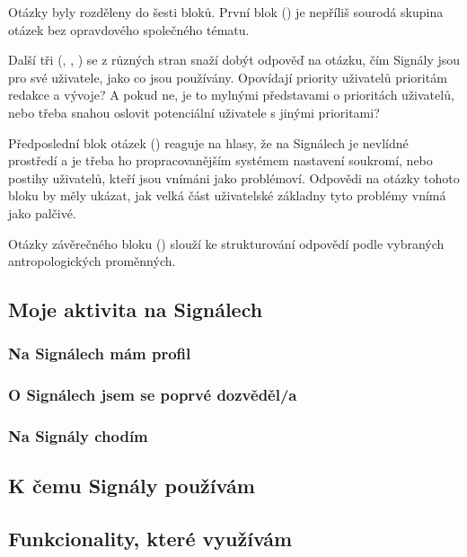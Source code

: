 \documentclass[12pt, a4paper, twoside]{article}
\begin{document}
Otázky byly rozděleny do šesti bloků.
První blok ()
je nepříliš sourodá skupina otázek bez opravdového společného tématu.

Další tři
(, , )
se z různých stran snaží dobýt odpověď na otázku, čím Signály jsou
pro své uživatele, jako co jsou používány.
Opovídají priority uživatelů prioritám redakce a vývoje?
A pokud ne, je to mylnými představami o prioritách uživatelů,
nebo třeba snahou oslovit potenciální uživatele s jinými prioritami?

Předposlední blok otázek ()
reaguje na hlasy, že na Signálech je nevlídné prostředí
a je třeba ho  propracovanějším systémem nastavení
soukromí, nebo postihy uživatelů, kteří jsou vnímáni jako problémoví.
Odpovědi na otázky tohoto bloku by měly ukázat, jak velká část
uživatelské základny tyto problémy vnímá jako palčivé.

Otázky závěrečného bloku ()
slouží ke strukturování odpovědí
podle vybraných antropologických proměnných.

\subsection{Moje aktivita na Signálech}\label{sec:mojeaktivita}

\subsubsection{Na Signálech mám profil}

\subsubsection{O Signálech jsem se poprvé dozvěděl/a}

\subsubsection{Na Signály chodím}

\subsection{K čemu Signály používám}\label{sec:kcemu}

\subsection{Funkcionality, které využívám}\label{sec:funkcionality}
\end{document}

